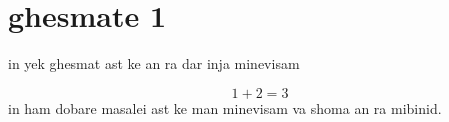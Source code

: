 \documentclass[12pt]{article}
\begin{document}
\setRTLmain
\section{ghesmate 1}

in yek ghesmat ast ke an ra dar inja minevisam

\begin{equation}
1+2=3
\end{equation}
in ham dobare masalei ast ke man minevisam va shoma an ra mibinid.
\end{document}

